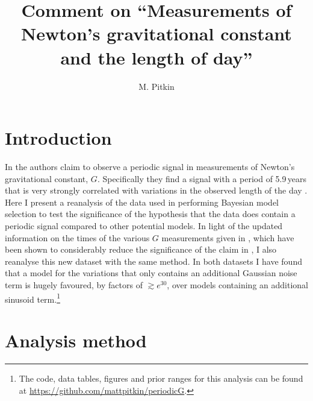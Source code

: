 \documentclass[comment]{epl2}
\title{Comment on ``Measurements of Newton's gravitational constant and the length of day''}
\author{M. Pitkin}
\institute{
  SUPA, School of Physics \& Astronomy, University of Glasgow, Glasgow, G12 8QQ, UK
}
\begin{document}
\maketitle

\section{Introduction}

In \cite{2015EL....11010002A} the authors claim to observe a periodic signal in measurements of
Newton's gravitational constant, $G$. Specifically they find a signal with a period of 5.9\,years that
is very strongly correlated with variations in the observed length of the day
\cite{2013Natur.499..202H}. Here I present a reanalysis of the data used in \cite{2015EL....11010002A}
performing Bayesian model selection to test the significance of the hypothesis that the data does contain
a periodic signal compared to other potential models. In light of the updated information on the times
of the various $G$ measurements given in \cite{2015arXiv150501774S}, which have been shown to considerably
reduce the significance of the claim in \cite{2015EL....11010002A}, I also reanalyse this new dataset with
the same method. In both datasets I have found that a model for the variations that only contains an
additional Gaussian noise term is hugely favoured, by factors of $\gtrsim e^{30}$, over models containing
an additional sinusoid term.\footnote{The code, data tables, figures and prior ranges for this analysis can be
found at \url{https://github.com/mattpitkin/periodicG}.}

\section{Analysis method}
\end{document}
